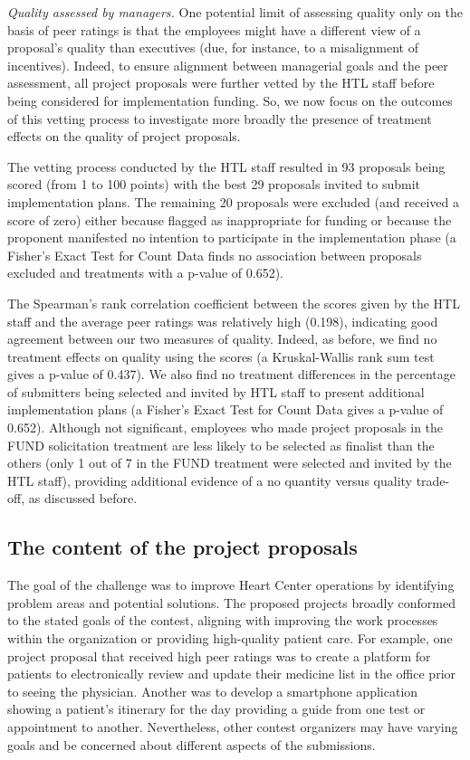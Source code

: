 \documentclass[12pt, titlepage]{article}
\begin{document}
\emph{Quality assessed by managers.} One potential limit of assessing
quality only on the basis of peer ratings is that the employees might
have a different view of a proposal's quality than executives (due, for
instance, to a misalignment of incentives). Indeed, to ensure alignment
between managerial goals and the peer assessment, all project proposals
were further vetted by the HTL staff before being considered for
implementation funding. So, we now focus on the outcomes of this vetting
process to investigate more broadly the presence of treatment effects on
the quality of project proposals.

The vetting process conducted by the HTL staff resulted in 93 proposals
being scored (from 1 to 100 points) with the best 29 proposals invited
to submit implementation plans. The remaining 20 proposals were excluded
(and received a score of zero) either because flagged as inappropriate
for funding or because the proponent manifested no intention to
participate in the implementation phase (a Fisher's Exact Test for Count
Data finds no association between proposals excluded and treatments with
a p-value of 0.652).

The Spearman's rank correlation coefficient between the scores given by
the HTL staff and the average peer ratings was relatively high (0.198),
indicating good agreement between our two measures of quality. Indeed,
as before, we find no treatment effects on quality using the scores (a
Kruskal-Wallis rank sum test gives a p-value of 0.437). We also find no
treatment differences in the percentage of submitters being selected and
invited by HTL staff to present additional implementation plans (a
Fisher's Exact Test for Count Data gives a p-value of 0.652). Although
not significant, employees who made project proposals in the FUND
solicitation treatment are less likely to be selected as finalist than
the others (only 1 out of 7 in the FUND treatment were selected and
invited by the HTL staff), providing additional evidence of a no
quantity versus quality trade-off, as discussed before.

\subsection{The content of the project
proposals}\label{the-content-of-the-project-proposals}

The goal of the challenge was to improve Heart Center operations by
identifying problem areas and potential solutions. The proposed projects
broadly conformed to the stated goals of the contest, aligning with
improving the work processes within the organization or providing
high-quality patient care. For example, one project proposal that
received high peer ratings was to create a platform for patients to
electronically review and update their medicine list in the office prior
to seeing the physician. Another was to develop a smartphone application
showing a patient's itinerary for the day providing a guide from one
test or appointment to another. Nevertheless, other contest organizers
may have varying goals and be concerned about different aspects of the
submissions.
\end{document}
